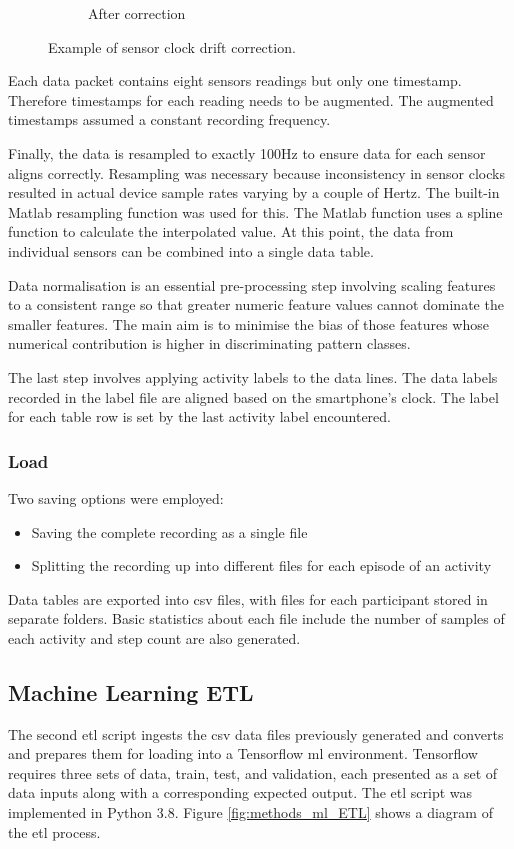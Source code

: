 \begin{figure}[hbt]
\begin{subfigure}{0.45\textwidth}
         \caption{After correction}
    \end{subfigure}
    \caption{Example of sensor clock drift correction.}
    \label{fig:methods-clock-drift-correction}
\end{figure}

Each data packet contains eight sensors readings but only one timestamp. Therefore timestamps for each reading needs to be augmented. The augmented timestamps assumed a constant recording frequency.

Finally, the data is resampled to exactly 100Hz to ensure data for each sensor aligns correctly. Resampling was necessary because inconsistency in sensor clocks resulted in actual device sample rates varying by a couple of Hertz. The built-in Matlab resampling function was used for this. The Matlab function uses a spline function to calculate the interpolated value. At this point, the data from individual sensors can be combined into a single data table.

Data normalisation is an essential pre-processing step involving scaling features to a consistent range so that greater numeric feature values cannot dominate the smaller features\cite{Singh2020}. The main aim is to minimise the bias of those features whose numerical contribution is higher in discriminating pattern classes.

The last step involves applying activity labels to the data lines. The data labels recorded in the label file are aligned based on the smartphone's clock. The label for each table row is set by the last activity label encountered.

\subsubsection{Load}
Two saving options were employed:
\begin{itemize}
    \item Saving the complete recording as a single file
    \item Splitting the recording up into different files for each episode of an activity
\end{itemize}

Data tables are exported into \acrshort{csv} files, with files for each participant stored in separate folders. Basic statistics about each file include the number of samples of each activity and step count are also generated.

\subsection{Machine Learning ETL}
\label{subsec:ML-ETL}
The second \acrshort{etl} script ingests the \acrshort{csv} data files previously generated and converts and prepares them for loading into a Tensorflow \acrshort{ml} environment. Tensorflow requires three sets of data, train, test, and validation, each presented as a set of data inputs along with a corresponding expected output. The \acrshort{etl} script was implemented in Python 3.8. Figure \ref{fig:methods_ml_ETL} shows a diagram of the \acrshort{etl} process.


